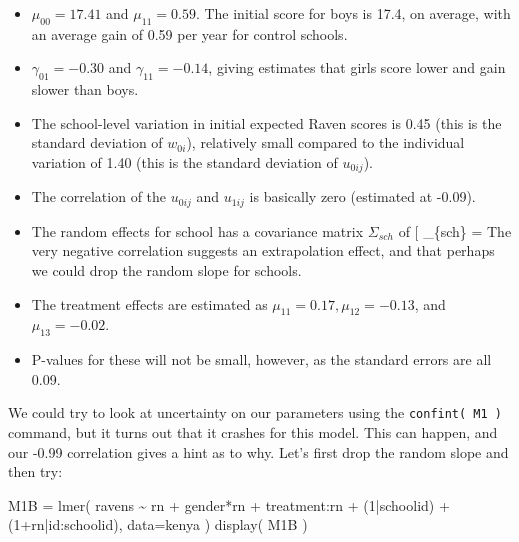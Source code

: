 \documentclass[
  letterpaper,
  DIV=11,
  numbers=noendperiod]{scrreprt}
\newenvironment{Shaded}{\begin{snugshade}}{\end{snugshade}}
\newcommand{\AttributeTok}[1]{\textcolor[rgb]{0.49,0.56,0.16}{#1}}
\newcommand{\DecValTok}[1]{\textcolor[rgb]{0.25,0.63,0.44}{#1}}
\newcommand{\FunctionTok}[1]{\textcolor[rgb]{0.02,0.16,0.49}{#1}}
\newcommand{\NormalTok}[1]{\textcolor[rgb]{0.00,0.44,0.13}{#1}}
\newcommand{\OtherTok}[1]{\textcolor[rgb]{0.00,0.44,0.13}{#1}}
\newcommand{\SpecialCharTok}[1]{\textcolor[rgb]{0.25,0.44,0.63}{#1}}
\providecommand{\tightlist}{%
  \setlength{\itemsep}{0pt}\setlength{\parskip}{0pt}}\usepackage{longtable,booktabs,array}
\begin{document}
\begin{itemize}
\tightlist
\item
  \(\mu_{00} = 17.41\) and \(\mu_{11} = 0.59\). The initial score for
  boys is 17.4, on average, with an average gain of 0.59 per year for
  control schools.
\item
  \(\gamma_{01} = -0.30\) and \(\gamma_{11} = -0.14\), giving estimates
  that girls score lower and gain slower than boys.
\item
  The school-level variation in initial expected Raven scores is 0.45
  (this is the standard deviation of \(w_{0i}\)), relatively small
  compared to the individual variation of 1.40 (this is the standard
  deviation of \(u_{0ij}\)).
\item
  The correlation of the \(u_{0ij}\) and \(u_{1ij}\) is basically zero
  (estimated at -0.09).
\item
  The random effects for school has a covariance matrix \(\Sigma_{sch}\)
  of {[} \widehat{\Sigma}\_\{sch\} = \left[ 
  \begin{array}{cc}
  0.45^2 & 0.45 \times 0.09 \times -0.99 \\
  . & 0.09^2 
  \end{array} 
  \right] {]} The very negative correlation suggests an extrapolation
  effect, and that perhaps we could drop the random slope for schools.
\item
  The treatment effects are estimated as
  \(\mu_{11}=0.17, \mu_{12}=-0.13\), and \(\mu_{13}=-0.02\).\\
\item
  P-values for these will not be small, however, as the standard errors
  are all 0.09.
\end{itemize}

We could try to look at uncertainty on our parameters using the
\texttt{confint(\ M1\ )} command, but it turns out that it crashes for
this model. This can happen, and our -0.99 correlation gives a hint as
to why. Let's first drop the random slope and then try:

\begin{Shaded}
\begin{Highlighting}[]
\NormalTok{M1B }\OtherTok{=} \FunctionTok{lmer}\NormalTok{( ravens }\SpecialCharTok{\textasciitilde{}}\NormalTok{ rn }\SpecialCharTok{+}\NormalTok{ gender}\SpecialCharTok{*}\NormalTok{rn }\SpecialCharTok{+}\NormalTok{ treatment}\SpecialCharTok{:}\NormalTok{rn }\SpecialCharTok{+}\NormalTok{ (}\DecValTok{1}\SpecialCharTok{|}\NormalTok{schoolid) }\SpecialCharTok{+}\NormalTok{ (}\DecValTok{1}\SpecialCharTok{+}\NormalTok{rn}\SpecialCharTok{|}\NormalTok{id}\SpecialCharTok{:}\NormalTok{schoolid), }
           \AttributeTok{data=}\NormalTok{kenya )}
\FunctionTok{display}\NormalTok{( M1B )}
\end{Highlighting}
\end{Shaded}
\end{document}
